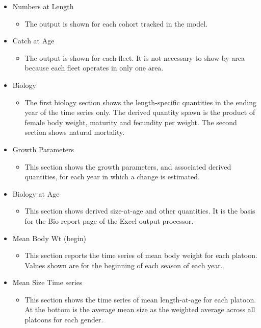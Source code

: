 \begin{itemize}
\begin{itemize}
	\end{itemize}
	\item Numbers at Length
	\begin{itemize}
		\item The output is shown for each cohort tracked in the model.
	\end{itemize}
	\item Catch at Age
	\begin{itemize}
		\item The output is shown for each fleet.  It is not necessary to show by area because each fleet operates in only one area.
	\end{itemize}
	\item Biology
	\begin{itemize}
		\item The first biology section shows the length-specific quantities in the ending year of the time series only. The derived quantity spawn is the product of female body weight, maturity and fecundity per weight. The second section shows natural mortality.
	\end{itemize}
	\item Growth Parameters
	\begin{itemize}
		\item This section shows the growth parameters, and associated derived quantities, for each year in which a change is estimated.
	\end{itemize}
	\item Biology at Age
	\begin{itemize}
		\item This section shows derived size-at-age and other quantities. It is the basis for the Bio report page of the Excel output processor.
	\end{itemize}
	\item Mean Body Wt (begin)
	\begin{itemize}
		\item This section reports the time series of mean body weight for each platoon. Values shown are for the beginning of each season of each year.
	\end{itemize}
	\item Mean Size Time series
	\begin{itemize}
		\item This section shows the time series of mean length-at-age for each platoon. At the bottom is the average mean size as the weighted average across all platoons for each gender.
	\end{itemize}

\end{itemize}

